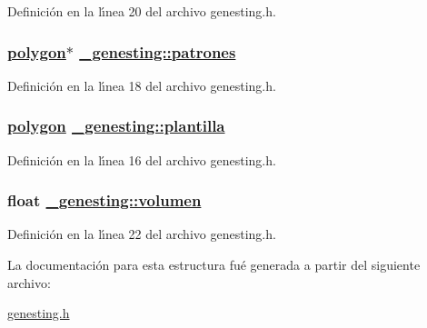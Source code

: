 Definici\'{o}n en la l\'{\i}nea 20 del archivo genesting.h.\hypertarget{struct__genesting_c4b1743e42547577dbb6d7238ad4db17_c4b1743e42547577dbb6d7238ad4db17}{
\subsubsection[patrones]{\setlength{\rightskip}{0pt plus 5cm}\hyperlink{struct__polygon}{polygon}$\ast$ \hyperlink{struct__genesting_c4b1743e42547577dbb6d7238ad4db17_c4b1743e42547577dbb6d7238ad4db17}{\_\-genesting::patrones}}}
\label{struct__genesting_c4b1743e42547577dbb6d7238ad4db17_c4b1743e42547577dbb6d7238ad4db17}




Definici\'{o}n en la l\'{\i}nea 18 del archivo genesting.h.\hypertarget{struct__genesting_c660e2710da2db9469813d0a14981cef_c660e2710da2db9469813d0a14981cef}{
\subsubsection[plantilla]{\setlength{\rightskip}{0pt plus 5cm}\hyperlink{struct__polygon}{polygon} \hyperlink{struct__genesting_c660e2710da2db9469813d0a14981cef_c660e2710da2db9469813d0a14981cef}{\_\-genesting::plantilla}}}
\label{struct__genesting_c660e2710da2db9469813d0a14981cef_c660e2710da2db9469813d0a14981cef}




Definici\'{o}n en la l\'{\i}nea 16 del archivo genesting.h.\hypertarget{struct__genesting_313b6909792763a5381ce7ff14830d6d_313b6909792763a5381ce7ff14830d6d}{
\subsubsection[volumen]{\setlength{\rightskip}{0pt plus 5cm}float \hyperlink{struct__genesting_313b6909792763a5381ce7ff14830d6d_313b6909792763a5381ce7ff14830d6d}{\_\-genesting::volumen}}}
\label{struct__genesting_313b6909792763a5381ce7ff14830d6d_313b6909792763a5381ce7ff14830d6d}




Definici\'{o}n en la l\'{\i}nea 22 del archivo genesting.h.

La documentaci\'{o}n para esta estructura fu\'{e} generada a partir del siguiente archivo:\begin{CompactItemize}
\item 
\hyperlink{genesting_8h}{genesting.h}\end{CompactItemize}
